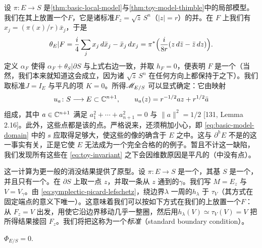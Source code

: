 \begin{example}\label{thm:local-model-sections}
设 $\pi\colon E\to S$ 是\cref{thm:basic-local-model}与\cref{thm:toy-model-thimble}中的局部模型。我们在其上放置一个\trLagrange\trBoundaryCondition{}$F$，它是诸标准\trVanishingCycle{}$F_z=\sqrt{\bar z}\,S^n$（$|z|=r$）的并。在 $F$ 上我们有 $x_j=(\pi(x)/r)\bar x_j$，于是
\begin{equation*}
\theta_E|F=\frac{i}{4}\sum_j x_j\,d\bar x_j-\bar x_j\,dx_j=\pi^*\Bigl(\frac{i}{8r}(z\,d\bar z-\bar z\,dz)\Bigr).
\end{equation*}
定义 $\alpha_F$ 使得 $\alpha_F+\theta_S|\partial S$ 与上式右边一致，并取 $h_F=0$，便表明 $F$ 是一个\trLagrange\trBoundaryCondition（当然，我们本来就知道这会成立，因为诸 $\sqrt{\bar z}\,S^n$ 在任何方向上都保持于\trParallelTransport{}之下）。我们取标准\trComplexStructure{}$J=I_E$ 与平凡的\trInhomogeneous{}项 $K=0$。所得\trModuliSpace{}$\mathscr{M}_{E/S}$ 可以显式确定：它由映射
\begin{equation}\label{eq:local-model-sections}
u_a\colon S\longrightarrow E\subset\mathbb{C}^{n+1},\qquad u_a(z)=r^{-1/2}az+r^{1/2}\bar a
\end{equation}
组成，其中 $a\in\mathbb{C}^{n+1}$ 满足 $a_1^2+\cdots+a_{n+1}^2=0$ 与 $\|a\|^2=1/2$ [131, Lemma 2.16]。此外，这些点都是该\trModuliSpace{}的\trRegular{}点。严格说来，还须稍加小心，即 \eqref{eq:basic-model-domain} 中的 $s$ 应取得足够大，使这些\trSection{}的像的确含于 $E$ 之中。这与 $\partial^hE$ 不是\trHolomorphic\trConvex{}的这一事实有关，正是它使 $E$ 无法成为一个完全合格的\trExact\trLefschetzFibration{}的例子。暂且不计这一缺陷，我们发现所有这些\trSection{}在\trInvariant{} \eqref{eq:toy-invariant} 之下会因维数原因是平凡的（\trModuliSpace{}中没有\trIsolated{}点）。
\end{example}
这一计算为更一般的消没结果提供了原型。设 $\pi\colon E\to S$ 是一个\trLefschetzFibration，其基 $S$ 是一个\trDisk，并且只有一个\trCriticalPoint。在 $\partial S$ 上取一点 $z$，并取一条从 $z$ 通到\trCriticalValue{}的\trVanishingPath{}$\gamma$。我们写 $M=E_z$ 与 $V=V_\gamma$。由 \eqref{eq:symplectic-picard-lefschetz}，绕边界\trLoop{}$\lambda$ 一周的\trMonodromy{}$h_\lambda$ \trIsotopy{}于 $\tau_V$（其方式在固定端点的\trHomotopy{}意义下唯一）。这意味着我们可以按如下方式在我们的\trFibration{}上放置一个\trMovingBoundaryCondition{}$F$：从 $F_z=V$ 出发，用\trParallelTransport{}使它沿边界移动几乎一整圈，然后用\trIsotopy{}$h_\lambda(V)\simeq\tau_V(V)=V$ 把所得结果接回 $F_z$。我们将把这称为一个\emph{标准\trBoundaryCondition}（standard boundary condition）。
\begin{lemma}\label{thm:phi-es-vanishing}
$\Phi_{E/S}=0$.
\end{lemma}

